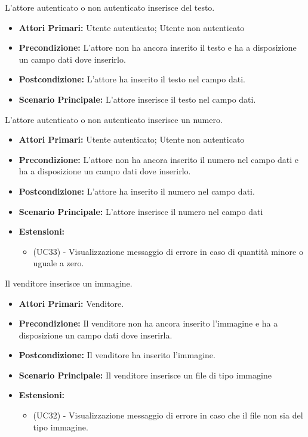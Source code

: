 L'attore autenticato o non autenticato inserisce del testo.
\begin{itemize}
    \item \textbf{Attori Primari:} Utente autenticato; Utente non autenticato
    \item \textbf{Precondizione:} L'attore non ha ancora inserito il testo e ha a disposizione un campo dati dove inserirlo.
    \item \textbf{Postcondizione:} L'attore ha inserito il testo nel campo dati.
    \item \textbf{Scenario Principale:} L'attore inserisce il testo nel campo dati.
\end{itemize}

L'attore autenticato o non autenticato inserisce un numero.
\begin{itemize}
    \item \textbf{Attori Primari:} Utente autenticato; Utente non autenticato
    \item \textbf{Precondizione:} L'attore non ha ancora inserito il numero nel campo dati e ha a disposizione un campo dati dove inserirlo.
    \item \textbf{Postcondizione:} L'attore ha inserito il numero nel campo dati.
    \item \textbf{Scenario Principale:} L'attore inserisce il numero nel campo dati
    \item \textbf{Estensioni:}
    \begin{itemize}
        \item (UC33) - Visualizzazione messaggio di errore in caso di quantità minore o uguale a zero.
    \end{itemize}
\end{itemize}

Il venditore inserisce un immagine.
\begin{itemize}
    \item \textbf{Attori Primari:} Venditore.
    \item \textbf{Precondizione:} Il venditore non ha ancora inserito l'immagine e ha a disposizione un campo dati dove inserirla.
    \item \textbf{Postcondizione:} Il venditore ha inserito l'immagine.
    \item \textbf{Scenario Principale:} Il venditore inserisce un file di tipo immagine
    \item \textbf{Estensioni:}
    \begin{itemize}
        \item (UC32) - Visualizzazione messaggio di errore in caso che il file non sia del tipo immagine.
    \end{itemize}
\end{itemize}
